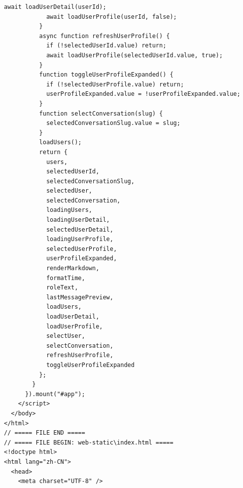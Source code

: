 \documentclass[12pt,a4paper]{article}
\begin{document}
\begin{Verbatim}[fontsize=\footnotesize]
            await loadUserDetail(userId);
            await loadUserProfile(userId, false);
          }
          async function refreshUserProfile() {
            if (!selectedUserId.value) return;
            await loadUserProfile(selectedUserId.value, true);
          }
          function toggleUserProfileExpanded() {
            if (!selectedUserProfile.value) return;
            userProfileExpanded.value = !userProfileExpanded.value;
          }
          function selectConversation(slug) {
            selectedConversationSlug.value = slug;
          }
          loadUsers();
          return {
            users,
            selectedUserId,
            selectedConversationSlug,
            selectedUser,
            selectedConversation,
            loadingUsers,
            loadingUserDetail,
            selectedUserDetail,
            loadingUserProfile,
            selectedUserProfile,
            userProfileExpanded,
            renderMarkdown,
            formatTime,
            roleText,
            lastMessagePreview,
            loadUsers,
            loadUserDetail,
            loadUserProfile,
            selectUser,
            selectConversation,
            refreshUserProfile,
            toggleUserProfileExpanded
          };
        }
      }).mount("#app");
    </script>
  </body>
</html>
// ===== FILE END =====
// ===== FILE BEGIN: web-static\index.html =====
<!doctype html>
<html lang="zh-CN">
  <head>
    <meta charset="UTF-8" />
\end{Verbatim}
\newpage
{}
\fancyhead[R]{}
\end{document}
